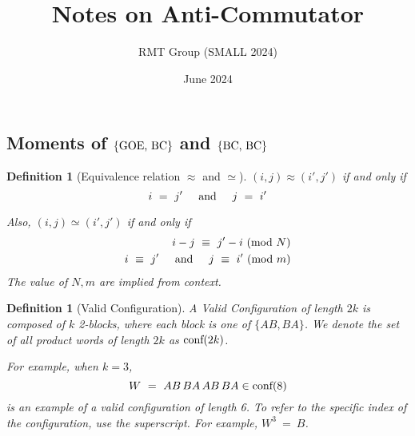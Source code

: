 \documentclass[12pt,reqno]{amsart}
\theoremstyle{plain} %
\newtheorem{definition}[theorem]{Definition}
\theoremstyle{remark}
\theoremstyle{definition}
\renewcommand{\mod}[1]{\textup{ (mod~$#1$)}}
\begin{document}
\pagestyle{fancy}{
\lhead{} \chead{} \rhead{}
\lfoot{} \cfoot{\thepage} \rfoot{}
}












\newcommand{\textOr}{
    {
        \hspace{5mm}
        \textrm{or}
        \hspace{5mm}
    }
}

\newcommand{\textAnd}{
    {
        \hspace{5mm}
        \textrm{and}
        \hspace{5mm}
    }
}


\newcommand{\PW}{\textnormal{conf}}
\newcommand{\NC}{\textnormal{NC}}








\title{Notes on Anti-Commutator}
\author{RMT Group (SMALL 2024)}
\date{June 2024}


\maketitle
\thispagestyle{empty}

\subsection{Moments of $\{\textup{GOE, BC}\}$ and $\{\textup{BC, BC}\}$}


\begin{definition} [Equivalence relation $\approx$ and $\simeq$]

    $(i, j) \approx (i', j')$ if and only if 
    \begin{equation}
        i \ = \ j' \textAnd j \ = \ i'
    \end{equation}

    Also, 
$(i, j) \simeq (i', j')$ if and only if 
    \begin{eqnarray}
        i - j \ \equiv \ j' - i \mod N 
    \\
       i \ \equiv \ j' \textAnd j \ \equiv \ i' \mod m
    \end{eqnarray}
    The value of $N, m$ are implied from context. 
\end{definition}


\begin{definition}[Valid Configuration]
A \textit{Valid Configuration} of length \(2k\) is composed of \(k\) 2-blocks, where each block is one of \(\{AB, BA\}\). 
We denote the set of all product words of length $2k$ as 
$\PW(2k)$.


For example, when \(k = 3\),
\[
W \ = \ AB \, BA \, AB \, BA \in \PW(8)
\]
is an example of a valid configuration of length 6. To 
refer to the specific index of the configuration, use the superscript. 
For example, $W^{3} \ =\ B$. 

\end{definition}
\end{document}
